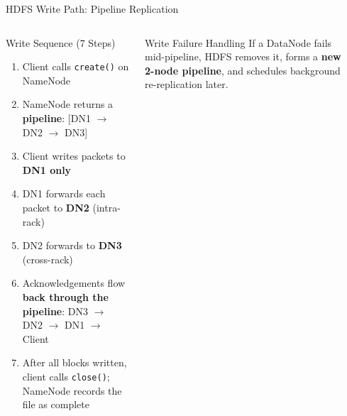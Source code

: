 \documentclass[aspectratio=169,10pt]{beamer}
\begin{document}
\begin{frame}{HDFS Write Path: Pipeline Replication}
  \begin{columns}[T]
      \begin{block}{Write Sequence (7 Steps)}
        \begin{enumerate}
          \item Client calls \texttt{create()} on NameNode
          \item NameNode returns a \textbf{pipeline}: [DN1 $\to$ DN2 $\to$ DN3]
          \item Client writes packets to \textbf{DN1 only}
          \item DN1 forwards each packet to \textbf{DN2} (intra-rack)
          \item DN2 forwards to \textbf{DN3} (cross-rack)
          \item Acknowledgements flow \textbf{back through the pipeline}: DN3 $\to$ DN2 $\to$ DN1 $\to$ Client
          \item After all blocks written, client calls \texttt{close()}; NameNode records the file as complete
        \end{enumerate}
      \end{block}
      \vspace{2pt}
      \begin{alertblock}{Write Failure Handling}
        If a DataNode fails mid-pipeline, HDFS removes it, forms a \textbf{new 2-node pipeline}, and schedules background re-replication later.
      \end{alertblock}

      \begin{center}
\end{center}
\end{columns}
\end{frame}
\end{document}
